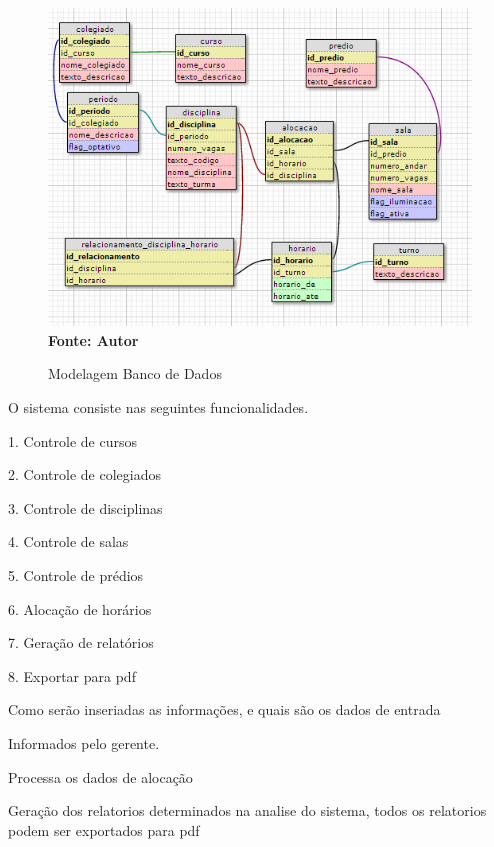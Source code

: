 		\begin{figure}[!htb]
   		\caption[Modelagem Banco de Dados]{Modelagem Banco de Dados}
   		\label{fig:figura3}
   		\centering
   		\includegraphics{modelagemBanco.png}
   		\\ \textbf{\footnotesize Fonte: Autor}
	\end{figure}


	O sistema consiste nas seguintes funcionalidades.

	1. Controle de cursos \par
	2. Controle de colegiados\par
	3. Controle de disciplinas\par
	4. Controle de salas\par
	5. Controle de prédios\par
	6. Alocação de horários\par
	7. Geração de relatórios\par
	8. Exportar para pdf\par




	Como serão inseriadas as informações, e quais são os dados de entrada

	Informados pelo gerente.


	Processa os dados de alocação


	Geração dos relatorios determinados na analise do sistema, todos os relatorios podem ser exportados para pdf
